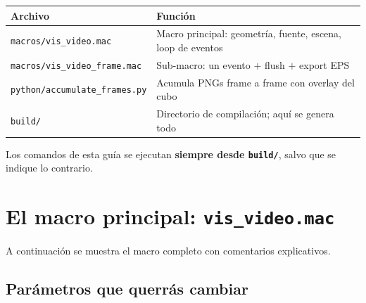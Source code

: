 \documentclass[11pt,a4paper]{article}
\begin{document}
\begin{center}
\begin{tabular}{lp{9cm}}
  \toprule
  \textbf{Archivo} & \textbf{Función} \\
  \midrule
  \texttt{macros/vis\_video.mac}       & Macro principal: geometría, fuente, escena, loop de eventos \\
  \texttt{macros/vis\_video\_frame.mac} & Sub-macro: un evento $+$ flush $+$ export EPS \\
  \texttt{python/accumulate\_frames.py} & Acumula PNGs frame a frame con overlay del cubo \\
  \texttt{build/}                       & Directorio de compilación; aquí se genera todo \\
  \bottomrule
\end{tabular}
\end{center}

Los comandos de esta guía se ejecutan \textbf{siempre desde \texttt{build/}},
salvo que se indique lo contrario.

\section{El macro principal: \texttt{vis\_video.mac}}

A continuación se muestra el macro completo con comentarios explicativos.



\subsection{Parámetros que querrás cambiar}
\end{document}
